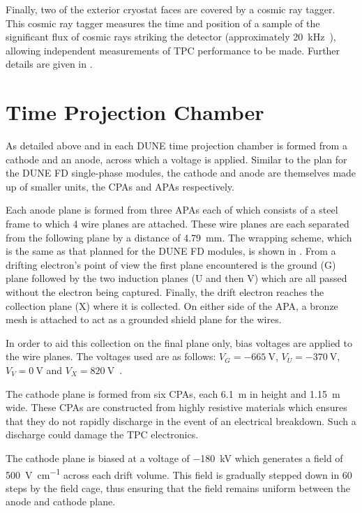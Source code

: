 Finally, two of the exterior cryostat faces are covered by a cosmic ray tagger.
This cosmic ray tagger measures the time and position of a sample of the significant flux of cosmic rays striking the detector (approximately \SI{20}{\kilo\hertz}~\cite{protodunePerformance}), allowing independent measurements of TPC performance to be made.
Further details are given in .

\section{Time Projection Chamber}
\label{sec:protodune:tpc}

As detailed above and in  each DUNE time projection chamber is formed from a cathode and an anode, across which a voltage is applied.
Similar to the plan for the DUNE FD single-phase modules, the cathode and anode are themselves made up of smaller units, the CPAs and APAs respectively.

Each anode plane is formed from three APAs each of which consists of a steel frame to which 4 wire planes are attached.
These wire planes are each separated from the following plane by a distance of \SI{4.79}{\mm}.
The wrapping scheme, which is the same as that planned for the DUNE FD modules, is shown in .
From a drifting electron's point of view the first plane encountered is the ground (G) plane followed by the two induction planes (U and then V) which are all passed without the electron being captured.
Finally, the drift electron reaches the collection plane (X) where it is collected.
On either side of the APA, a bronze mesh is attached to act as a grounded shield plane for the wires.

In order to aid this collection on the final plane only, bias voltages are applied to the wire planes.
The voltages used are as follows: $V_{G} = \SI{-665}{\volt}$, $V_{U} = \SI{-370}{\volt}$, $V_{V} = \SI{0}{\volt}$ and $V_{X} = \SI{+820}{\volt}$~\cite{protodunePerformance}.

The cathode plane is formed from six CPAs, each \SI{6.1}{\m} in height and \SI{1.15}{\m} wide.
These CPAs are constructed from highly resistive materials which ensures that they do not rapidly discharge in the event of an electrical breakdown.
Such a discharge could damage the TPC electronics.

The cathode plane is biased at a voltage of \SI{-180}{\kilo\volt} which generates a field of \SI{500}{\volt\per\cm} across each drift volume.
This field is gradually stepped down in 60 steps by the field cage, thus ensuring that the field remains uniform between the anode and cathode plane.


